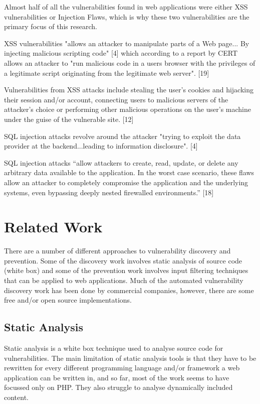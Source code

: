 \documentclass[12pt,a4paper]{article}
\begin{document}
Almost half of all the vulnerabilities found in web applications were either XSS vulnerabilities or Injection Flaws, which is why these two vulnerabilities are the primary focus of this research. 

XSS vulnerabilities "allows an attacker to manipulate parts of a Web page... By injecting malicious scripting code" [4] which according to a report by CERT allows an attacker to "run malicious code in a users browser with the privileges of a legitimate script originating from the legitimate web server". [19]

Vulnerabilities from XSS attacks include stealing the user's cookies and hijacking their session and/or account, connecting users to malicious servers of the attacker's choice or performing other malicious operations on the user's machine under the guise of the vulnerable site. [12]

SQL injection attacks revolve around the attacker "trying to exploit the data provider at the backend...leading to information disclosure". [4]

SQL injection attacks “allow attackers to create, read, update, or delete any arbitrary data available to the application. In the worst case scenario, these flaws allow an attacker to completely compromise the application and the underlying systems, even bypassing deeply nested firewalled environments.” [18] 

\section{Related Work}
There are a number of different approaches to vulnerability discovery and prevention.  Some of the discovery work involves static analysis of source code (white box) and some of the prevention work involves input filtering techniques that can be applied to web applications.
Much of the automated vulnerability discovery work has been done by commercial companies, however, there are some free and/or open source implementations.

\subsection{Static Analysis}
Static analysis is a white box technique used to analyse source code for vulnerabilities.  The main limitation of static analysis tools is that they have to be rewritten for every different programming language and/or framework a web application can be written in, and so far, most of the work seems to have focussed only on PHP.  They also struggle to analyse dynamically included content.
\end{document}
